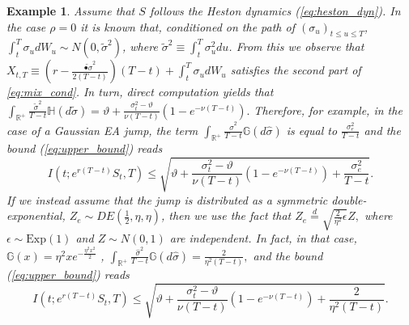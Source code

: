 \documentclass[11pt]{article}
\newtheorem{example}[theorem]{Example}
\numberwithin{equation}{section}
\numberwithin{theorem}{section}
\def\G{\mathbb{G}}
\def\H{\mathbb{H}}
\begin{document}
\begin{example}\label{example1}
Assume that $S$ follows the Heston dynamics (\ref{eq:heston_dyn}).  
In the case $\rho=0$ it is known that, conditioned on the   path of $(\sigma_u)_{t\le u \le T}$, $\int_{t}^{T}\sigma_{u}dW_{u} \sim N\left(0,\tilde{\sigma}^{2}\right)
$, where $\tilde{\sigma}^{2}\equiv\int_{t}^{T}\sigma_{u}^{2}du$. From this we observe that $X_{t,T}\equiv \left(r-\frac{\tilde{•\sigma}^2}{2(T-t)}\right)(T-t)+\int_{t}^{T}\sigma_{u}dW_{u}$ satisfies the second part of \eqref{eq:mix_cond}.  In turn, direct computation yields  that $\int_{\mathbb{R}^{+}}\frac{\tilde{\sigma}^{2}}{T-t}\H\left(d\tilde{\sigma}\right)=\vartheta+\frac{\sigma_{t}^2-\vartheta}{\nu\left(T-t\right)}\left(1-e^{-\nu\left(T-t\right)}\right).$
Therefore, for example, in the case of a Gaussian EA jump, the term $\int_{\mathbb{R}^{+}}\frac{\hat{\sigma}^{2}}{T-t}\G\left(d\hat{\sigma}\right)$
is  equal to $\frac{\sigma_{e}^{2}}{T-t}$ and the bound (\ref{eq:upper_bound}) reads 
\begin{equation}
I\left(t;e^{r\left(T-t\right)}S_{t},T\right)\leq\sqrt{\vartheta+\frac{\sigma_{t}^2-\vartheta}{\nu\left(T-t\right)}\left(1-e^{-\nu\left(T-t\right)}\right)+\frac{\sigma_{e}^{2}}{T-t}}.
\label{eq:up_bound_exG}
\end{equation}
If we instead assume that the jump is distributed as a symmetric double-exponential,
$Z_{e}\sim DE\left(\frac{1}{2},\eta,\eta\right)$, then we use the fact that $Z_{e}\overset{d}{=}\sqrt{\frac{2}{\eta^{2}}\epsilon}Z,$
where $\epsilon\sim\mbox{Exp}\left(1\right)$ and $Z\sim N\left(0,1\right)$ are independent.
In fact, in that case, $\G\left(x\right)=\eta^{2}xe^{-\frac{\eta^{2}x^{2}}{2}}$ , $\int_{\mathbb{R}^{+}}\frac{\hat{\sigma}^{2}}{T-t}\G\left(d\hat{\sigma}\right)=\frac{2}{\eta^{2}\left(T-t\right)},$
and the bound (\ref{eq:upper_bound}) reads 
\begin{equation}
I\left(t;e^{r\left(T-t\right)}S_{t},T\right)\leq\sqrt{\vartheta+\frac{\sigma_{t}^2-\vartheta}{\nu\left(T-t\right)}\left(1-e^{-\nu\left(T-t\right)}\right)+\frac{2}{\eta^{2}\left(T-t\right)}}.
\label{eq:up_bound_exDE}
\end{equation} 
\end{example}
\end{document}
